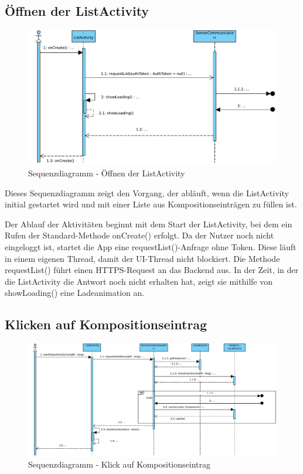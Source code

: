 \subsection*{ Öffnen der ListActivity}

\begin{figure}[h]
	\centering
	\includegraphics[width=\textwidth]{img/Diagramme/Sequenz/App_list}
	\caption{Sequenzdiagramm - Öffnen der ListActivity}
	\label{fig:sequenz-app_list}
\end{figure}
\noindent
Dieses Sequenzdiagramm zeigt den Vorgang, der abläuft, wenn die ListActivity initial gestartet wird und mit einer Liste aus Kompositionseinträgen zu füllen ist.\newline

\noindent Der Ablauf der Aktivitäten beginnt mit dem Start der ListActivity, bei dem ein Rufen der Standard-Methode onCreate() erfolgt. Da der Nutzer noch nicht eingeloggt ist, startet die App eine requestList()-Anfrage ohne Token. Diese läuft in einem eigenen Thread, damit der UI-Thread nicht blockiert. Die Methode requestList() führt einen HTTPS-Request an das Backend aus. In der Zeit, in der die ListActivity die Antwort noch nicht erhalten hat, zeigt sie mithilfe von showLoading() eine Ladeanimation an.
\pagebreak
\subsection*{ Klicken auf Kompositionseintrag}

\begin{figure}[h]
	\centering
	\includegraphics[width=\textwidth]{img/Diagramme/Sequenz/App_detail}
	\caption{Sequenzdiagramm - Klick auf Kompositionseintrag}
	\label{fig:sequenz-App_detail}
\end{figure}


